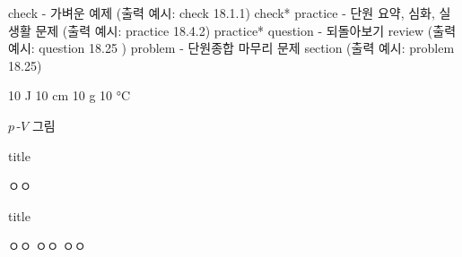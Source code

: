 





check - 가벼운 예제 (출력 예시: check 18.1.1)
check* 
practice - 단원 요약, 심화, 실생활 문제 (출력 예시: practice 18.4.2)
practice*
question - 되돌아보기 review (출력 예시: question 18.25 )
problem - 단원종합 마무리 문제 section (출력 예시: problem 18.25)





10 J 		
10 cm		
10 g		
10 °C       

$p\,$-$V$ 그림







\begin{solbox}{title}
\bnset
{}
\bn \zzz


 ㅇㅇ
\end{solbox}





\begin{solbox}{title}
\bnset
{}
\bn \zzz

\bnset
{}
\bn \zzz

\bnset
{}
\bn \zzz

 ㅇㅇ \zzz
{} ㅇㅇ \zzz
{} ㅇㅇ
\end{solbox}







